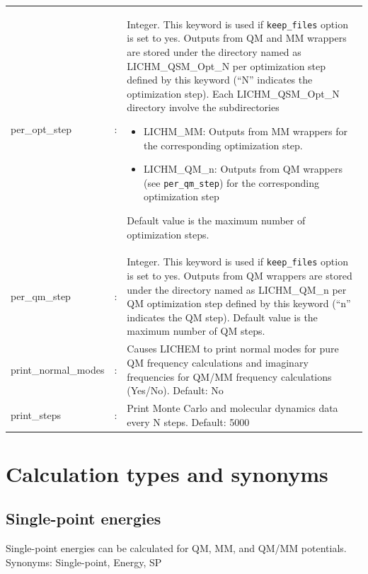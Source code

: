 \documentclass[12pt]{report}
\begin{document}
\begin{center}
\begin{longtable}[c]{ p{4cm} c p{12.5cm}}
per\_opt\_step & : &
Integer.
This keyword is used if \texttt{keep\_files}
option is set to
yes.
Outputs from QM and MM wrappers
are stored under the directory named as
LICHM\_QSM\_Opt\_N  per
optimization step defined by this keyword
(``N'' indicates the optimization step).
Each LICHM\_QSM\_Opt\_N directory
involve the subdirectories
\begin{itemize}
\item LICHM\_MM: Outputs from MM wrappers
for the corresponding optimization step.
\item  LICHM\_QM\_n: Outputs from
QM wrappers (see \texttt{per\_qm\_step})
for the corresponding optimization step
\end{itemize}
Default value is the maximum number of optimization
steps. \newline \\

per\_qm\_step & : &
Integer.
This keyword is used if \texttt{keep\_files}
option is set to
yes. Outputs from QM wrappers
are stored under the directory named as
LICHM\_QM\_n  per
QM optimization step defined by this keyword
(``n'' indicates the QM step).
Default value is the maximum number of QM
steps.\newline \\

print\_normal\_modes & : & Causes LICHEM to print normal modes for pure QM
frequency calculations and imaginary frequencies for QM/MM frequency
calculations (Yes/No).
Default: No \newline\\

print\_steps & : & Print Monte Carlo and molecular dynamics data every N steps.
Default: 5000 \\
\end{longtable}
\end{center}
\section{Calculation types and synonyms}
\label{sec:CalcTyp}

\subsection{Single-point energies}

Single-point energies can be calculated for QM, MM, and QM/MM potentials.
Synonyms: Single-point, Energy, SP
\end{document}
